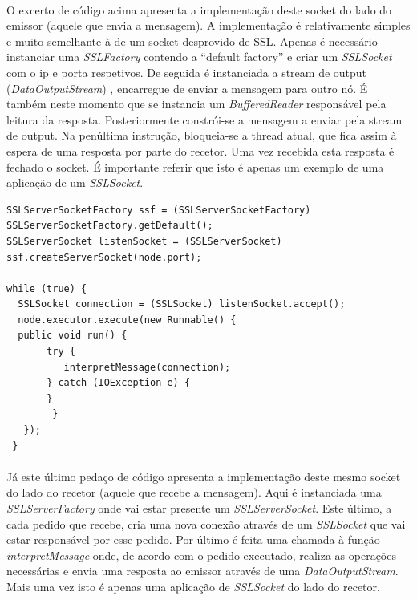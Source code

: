 \documentclass[11pt,oneside]{book}
\begin{document}
\paragraph{}
    O excerto de código acima apresenta a implementação deste socket do lado do emissor 
    (aquele que envia a mensagem).  A implementação é relativamente simples e muito semelhante
    à de um socket desprovido de SSL. Apenas é necessário instanciar uma \textit{SSLFactory} contendo a
    “default factory” e criar um \textit{SSLSocket} com o ip e porta respetivos. De seguida é instanciada
    a stream de output (\textit{DataOutputStream}) , encarregue de enviar a mensagem para outro nó. É 
    também neste momento que se instancia um \textit{BufferedReader} responsável pela leitura da resposta. 
    Posteriormente constrói-se a mensagem a enviar pela stream de output. Na penúltima instrução, 
    bloqueia-se a thread atual, que fica assim à espera de uma resposta por parte do recetor. 
    Uma vez recebida esta resposta é fechado o socket. É importante referir que isto é apenas
    um exemplo de uma aplicação de um \textit{SSLSocket}.

\pagebreak

\begin{lstlisting}
SSLServerSocketFactory ssf = (SSLServerSocketFactory) SSLServerSocketFactory.getDefault();
SSLServerSocket listenSocket = (SSLServerSocket) ssf.createServerSocket(node.port);

while (true) {
  SSLSocket connection = (SSLSocket) listenSocket.accept();
  node.executor.execute(new Runnable() {
  public void run() {
       try {
          interpretMessage(connection);
       } catch (IOException e) {
       }
        }
   });
 }

\end{lstlisting}

\paragraph{}
    Já este último pedaço de código apresenta a implementação deste mesmo socket do lado do recetor
    (aquele que recebe a mensagem). Aqui é instanciada uma \textit{SSLServerFactory} onde vai estar presente 
    um \textit{SSLServerSocket}.  Este último, a cada pedido que recebe, cria uma nova conexão através de um 
    \textit{SSLSocket} que vai estar responsável por esse pedido. Por último é feita uma chamada à função 
    \textit{interpretMessage} onde, de acordo com o pedido executado, realiza as operações necessárias e envia
    uma resposta ao emissor através de uma \textit{DataOutputStream}. Mais uma vez isto é apenas uma
    aplicação de \textit{SSLSocket} do lado do recetor.
\end{document}
